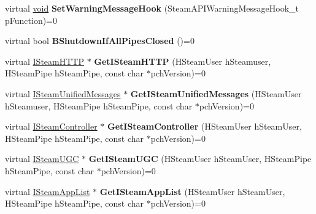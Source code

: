 \begin{DoxyCompactItemize}
\item 
\hypertarget{classISteamClient_a3ed1292f4e10c9817a7f58d78661979d}{}virtual \hyperlink{SDL__audio_8h_a52835ae37c4bb905b903cbaf5d04b05f}{void} {\bfseries Set\+Warning\+Message\+Hook} (Steam\+A\+P\+I\+Warning\+Message\+Hook\+\_\+t p\+Function)=0\label{classISteamClient_a3ed1292f4e10c9817a7f58d78661979d}

\item 
\hypertarget{classISteamClient_a17835d1bba0fc6b9ca901034159538ff}{}virtual bool {\bfseries B\+Shutdown\+If\+All\+Pipes\+Closed} ()=0\label{classISteamClient_a17835d1bba0fc6b9ca901034159538ff}

\item 
\hypertarget{classISteamClient_ab2d3f0ac0c549a30446281b1540373e6}{}virtual \hyperlink{classISteamHTTP}{I\+Steam\+H\+T\+T\+P} $\ast$ {\bfseries Get\+I\+Steam\+H\+T\+T\+P} (H\+Steam\+User h\+Steamuser, H\+Steam\+Pipe h\+Steam\+Pipe, const char $\ast$pch\+Version)=0\label{classISteamClient_ab2d3f0ac0c549a30446281b1540373e6}

\item 
\hypertarget{classISteamClient_a0bab727a7193d47e93c2927405ccbd06}{}virtual \hyperlink{classISteamUnifiedMessages}{I\+Steam\+Unified\+Messages} $\ast$ {\bfseries Get\+I\+Steam\+Unified\+Messages} (H\+Steam\+User h\+Steamuser, H\+Steam\+Pipe h\+Steam\+Pipe, const char $\ast$pch\+Version)=0\label{classISteamClient_a0bab727a7193d47e93c2927405ccbd06}

\item 
\hypertarget{classISteamClient_a0531bd3d6001a10c041d15accaf17f5b}{}virtual \hyperlink{classISteamController}{I\+Steam\+Controller} $\ast$ {\bfseries Get\+I\+Steam\+Controller} (H\+Steam\+User h\+Steam\+User, H\+Steam\+Pipe h\+Steam\+Pipe, const char $\ast$pch\+Version)=0\label{classISteamClient_a0531bd3d6001a10c041d15accaf17f5b}

\item 
\hypertarget{classISteamClient_a8c10ba747f7bd892506f8c1bf198552c}{}virtual \hyperlink{classISteamUGC}{I\+Steam\+U\+G\+C} $\ast$ {\bfseries Get\+I\+Steam\+U\+G\+C} (H\+Steam\+User h\+Steam\+User, H\+Steam\+Pipe h\+Steam\+Pipe, const char $\ast$pch\+Version)=0\label{classISteamClient_a8c10ba747f7bd892506f8c1bf198552c}

\item 
\hypertarget{classISteamClient_a2de12d3b253767a74b0112b542c7e7b1}{}virtual \hyperlink{classISteamAppList}{I\+Steam\+App\+List} $\ast$ {\bfseries Get\+I\+Steam\+App\+List} (H\+Steam\+User h\+Steam\+User, H\+Steam\+Pipe h\+Steam\+Pipe, const char $\ast$pch\+Version)=0\label{classISteamClient_a2de12d3b253767a74b0112b542c7e7b1}


\end{DoxyCompactItemize}
